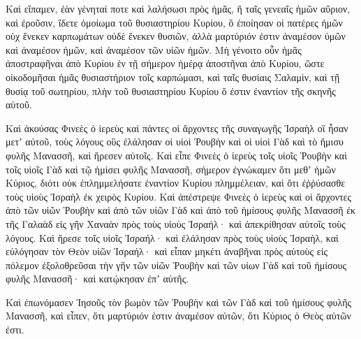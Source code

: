 {Καὶ εἴπαμεν, ἐὰν γένηταί ποτε καὶ λαλήσωσι πρὸς ἡμᾶς, ἢ ταῖς γενεαῖς ἡμῶν αὔριον, καὶ ἐροῦσιν, ἴδετε ὁμοίωμα τοῦ θυσιαστηρίου Κυρίου, ὃ ἐποίησαν οἱ πατέρες ἡμῶν οὐχ ἕνεκεν καρπωμάτων οὐδὲ ἕνεκεν θυσιῶν, ἀλλὰ μαρτύριόν ἐστιν ἀναμέσον ὑμῶν καὶ ἀναμέσον ἡμῶν, καὶ ἀναμέσον τῶν υἱῶν ἡμῶν.
Μὴ γένοιτο οὖν ἡμᾶς ἀποστραφῆναι ἀπὸ Κυρίου ἐν τῇ σήμερον ἡμέρᾳ ἀποστῆναι ἀπὸ Κυρίου, ὥστε οἰκοδομῆσαι ἡμᾶς θυσιαστήριον τοῖς καρπώμασι, καὶ ταῖς θυσίαις Σαλαμὶν, καὶ τῇ θυσίᾳ τοῦ σωτηρίου, πλὴν τοῦ θυσιαστηρίου Κυρίου ὅ ἐστιν ἐναντίον τῆς σκηνῆς αὐτοῦ.
\par }{\PP {}Καὶ ἀκούσας Φινεὲς ὁ ἱερεὺς καὶ πάντες οἱ ἄρχοντες τῆς συναγωγῆς Ἰσραὴλ οἳ ἦσαν μετʼ αὐτοῦ, τοὺς λόγους οὓς ἐλάλησαν οἱ υἱοὶ Ῥουβὴν καὶ οἱ υἱοὶ Γὰδ καὶ τὸ ἥμισυ φυλῆς Μανασσῆ, καὶ ἤρεσεν αὐτοῖς.
Καὶ εἶπε Φινεὲς ὁ ἱερεὺς τοῖς υἱοῖς Ῥουβὴν καὶ τοῖς υἱοῖς Γὰδ καὶ τῷ ἡμίσει φυλῆς Μανασσῆ, σήμερον ἐγνώκαμεν ὅτι μεθʼ ἡμῶν Κύριος, διότι οὐκ ἐπλημμελήσατε ἐναντίον Κυρίου πλημμέλειαν, καὶ ὅτι ἐῤῥύσασθε τοὺς υἱοὺς Ἰσραὴλ ἐκ χειρὸς Κυρίου.
Καὶ ἀπέστρεψε Φινεὲς ὁ ἱερεὺς καὶ οἱ ἄρχοντες ἀπὸ τῶν υἱῶν Ῥουβὴν καὶ ἀπὸ τῶν υἱῶν Γὰδ καὶ ἀπὸ τοῦ ἡμίσους φυλῆς Μανασσῆ ἐκ τῆς Γαλαὰδ εἰς γῆν Χαναὰν πρὸς τοὺς υἱοὺς Ἰσραήλ· καὶ ἀπεκρίθησαν αὐτοῖς τοὺς λόγους.
Καὶ ἤρεσε τοῖς υἱοῖς Ἰσραήλ· καὶ ἐλάλησαν πρὸς τοὺς υἱοὺς Ἰσραὴλ, καὶ εὐλόγησαν τὸν Θεὸν υἱῶν Ἰσραήλ· καὶ εἶπαν μηκέτι ἀναβῆναι πρὸς αὐτοὺς εἰς πόλεμον ἐξολοθρεῦσαι τὴν γῆν τῶν υἱῶν Ῥουβὴν καὶ τῶν υἱων Γὰδ καὶ τοῦ ἡμίσους φυλῆς Μανασσῆ· καὶ κατῴκησαν ἐπʼ αὐτῆς.
\par }{\PP {}Καὶ ἐπωνόμασεν Ἰησοῦς τὸν βωμὸν τῶν Ῥουβὴν καὶ τῶν Γὰδ καὶ τοῦ ἡμίσους φυλῆς Μανασσῆ, καὶ εἶπεν, ὅτι μαρτύριόν ἐστιν ἀναμέσον αὐτῶν, ὅτι Κύριος ὁ Θεὸς αὐτῶν ἐστι.

}
